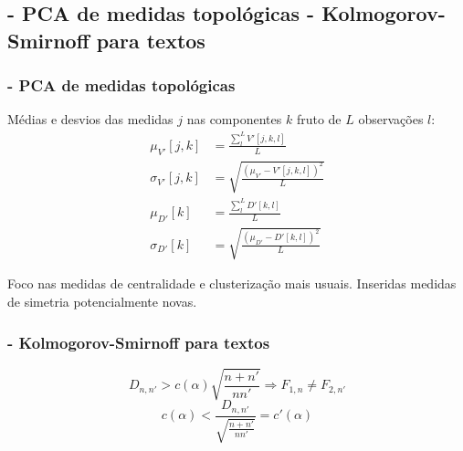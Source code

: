 \documentclass[10pt]{beamer}
\begin{document}
\begin{frame}
\subsection{- PCA de medidas topológicas \;\; - Kolmogorov-Smirnoff para textos}
\frametitle{- PCA de medidas topológicas}
Médias e desvios das medidas $j$ nas componentes $k$ fruto de $L$ observações $l$:
\begin{align}\label{eq:pca}
\mu_{V'}[j,k]   &=\frac{\sum_l^L V'[j,k,l]}{L}\nonumber\\
\sigma_{V'}[j,k]&=\sqrt{\frac{(\mu_{V'}-V'[j,k,l])^2}{L}}\\\nonumber
\mu_{D'}[k]&=\frac{\sum_l^L D'[k,l]}{L}\\\nonumber
\sigma_{D'}[k]&=\sqrt{\frac{(\mu_{D'}-D'[k,l])^2}{L}}
\end{align}

Foco nas medidas de centralidade e clusterização mais usuais. 
Inseridas medidas de simetria potencialmente novas.

\end{frame}
\begin{frame}
\frametitle{- Kolmogorov-Smirnoff para textos}
\begin{equation}\label{eq:ks}
D_{n,n'} > c(\alpha)\sqrt{\frac{n+n'}{nn'}} \Rightarrow F_{1,n} \neq F_{2,n'}
\end{equation}
\vspace{2cm}
\begin{equation}\label{eq:ks}
c(\alpha) < \frac{D_{n,n'}}{\sqrt{\frac{n+n'}{nn'}}} = c'(\alpha)
\end{equation}
\end{frame}
\end{document}
